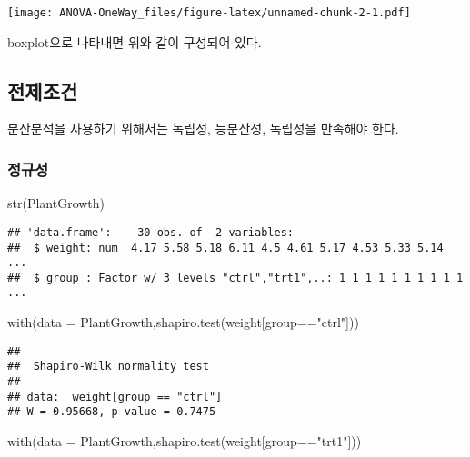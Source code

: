 \documentclass[
]{article}
\newenvironment{Shaded}{\begin{snugshade}}{\end{snugshade}}
\newcommand{\AttributeTok}[1]{\textcolor[rgb]{0.77,0.63,0.00}{#1}}
\newcommand{\FunctionTok}[1]{\textcolor[rgb]{0.00,0.00,0.00}{#1}}
\newcommand{\NormalTok}[1]{#1}
\newcommand{\SpecialCharTok}[1]{\textcolor[rgb]{0.00,0.00,0.00}{#1}}
\newcommand{\StringTok}[1]{\textcolor[rgb]{0.31,0.60,0.02}{#1}}
\begin{document}
\texttt{[image: ANOVA-OneWay\_files/figure-latex/unnamed-chunk-2-1.pdf]}

boxplot으로 나타내면 위와 같이 구성되어 있다.

\hypertarget{uxc804uxc81cuxc870uxac74}{%
\subsection{전제조건}\label{uxc804uxc81cuxc870uxac74}}

분산분석을 사용하기 위해서는 독립성, 등분산성, 독립성을 만족해야 한다.

\hypertarget{uxc815uxaddcuxc131}{%
\subsubsection{정규성}\label{uxc815uxaddcuxc131}}

\begin{Shaded}
\begin{Highlighting}[]
\FunctionTok{str}\NormalTok{(PlantGrowth)}
\end{Highlighting}
\end{Shaded}

\begin{verbatim}
## 'data.frame':    30 obs. of  2 variables:
##  $ weight: num  4.17 5.58 5.18 6.11 4.5 4.61 5.17 4.53 5.33 5.14 ...
##  $ group : Factor w/ 3 levels "ctrl","trt1",..: 1 1 1 1 1 1 1 1 1 1 ...
\end{verbatim}

\begin{Shaded}
\begin{Highlighting}[]
\FunctionTok{with}\NormalTok{(}\AttributeTok{data =}\NormalTok{ PlantGrowth,}\FunctionTok{shapiro.test}\NormalTok{(weight[group}\SpecialCharTok{==}\StringTok{"ctrl"}\NormalTok{]))}
\end{Highlighting}
\end{Shaded}

\begin{verbatim}
## 
##  Shapiro-Wilk normality test
## 
## data:  weight[group == "ctrl"]
## W = 0.95668, p-value = 0.7475
\end{verbatim}

\begin{Shaded}
\begin{Highlighting}[]
\FunctionTok{with}\NormalTok{(}\AttributeTok{data =}\NormalTok{ PlantGrowth,}\FunctionTok{shapiro.test}\NormalTok{(weight[group}\SpecialCharTok{==}\StringTok{"trt1"}\NormalTok{]))}
\end{Highlighting}
\end{Shaded}
\end{document}
